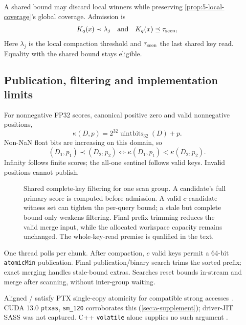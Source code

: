 A shared bound may discard local winners while preserving \cref{prop:5-local-coverage}'s global coverage. Admission is
\begin{equation}
 K_q(x)\prec\lambda_j
 \quad\text{and}\quad
 K_q(x)\preceq\tau_{\rm seen},
 \label{eq:5-admission}
\end{equation}
Here $\lambda_j$ is the local compaction threshold and $\tau_{\rm seen}$ the last shared key read. Equality with the shared bound stays eligible.

\subsection{Publication, filtering and implementation limits}

For nonnegative FP32 scores, canonical positive zero and valid nonnegative positions,
\begin{equation}
 \kappa(D,p)=2^{32}\operatorname{uintbits}_{32}(D)+p.
 \label{eq:5-packed-key}
\end{equation}
Non-NaN float bits are increasing on this domain, so
\[
 (D_1,p_1)\prec(D_2,p_2)\iff\kappa(D_1,p_1)<\kappa(D_2,p_2).
\]
Infinity follows finite scores; the all-one sentinel follows valid keys. Invalid positions cannot publish.

\begin{figure}[tbp]
\centering

\caption[Shared complete-key filtering]{Shared complete-key filtering for one scan group. A candidate's
full primary score is computed before admission. A valid $c$-candidate
witness set can tighten the per-query bound; a stale but complete bound
only weakens filtering. Final prefix trimming reduces the valid merge
input, while the allocated workspace capacity remains unchanged.
The whole-key-read premise is qualified in the text.}
\label{fig:5-shared-bound}
\end{figure}

One thread polls per chunk. After compaction, $c$ valid keys permit a 64-bit \texttt{atomicMin} publication. Final publication/binary search trims the sorted prefix; exact merging handles stale-bound extras. Searches reset bounds in-stream and merge after scanning, without inter-group waiting.

Aligned / satisfy PTX single-copy atomicity for compatible strong accesses \cite{ptx_isa}. CUDA 13.0 \texttt{ptxas}, \texttt{sm\_120} corroborates this (\cref{sec:a-supplement}); driver-JIT SASS was not captured. C++ \texttt{volatile} alone supplies no such argument \cite{cuda_programming_guide}.

